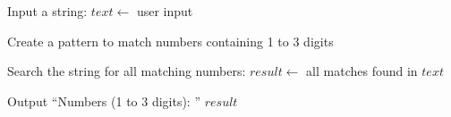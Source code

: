 \begin{algorithm}
\caption{Find Numbers Containing 1 to 3 Digits in a String}
\begin{algorithmic}[1]

\STATE Input a string:
\STATE $text \gets$ user input

\STATE Create a pattern to match numbers containing 1 to 3 digits

\STATE Search the string for all matching numbers:
\STATE $result \gets$ all matches found in $text$

\STATE Output ``Numbers (1 to 3 digits): '' $result$

\end{algorithmic}
\end{algorithm}